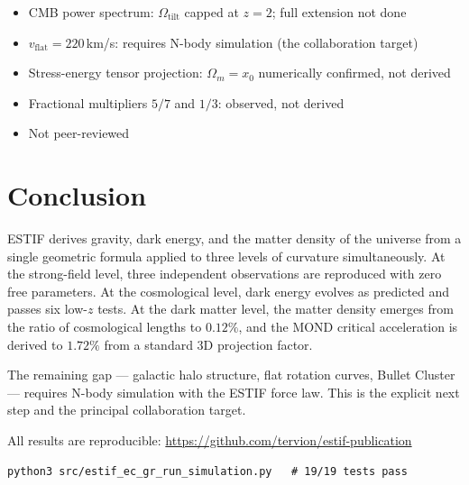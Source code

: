 \documentclass[12pt]{article}
\begin{document}
\begin{itemize}
\item CMB power spectrum: $\Omega_\text{tilt}$ capped at $z = 2$; full extension not done
\item $v_\text{flat} = 220$\,km/s: requires N-body simulation (the collaboration target)
\item Stress-energy tensor projection: $\Omega_m = x_0$ numerically confirmed, not derived
\item Fractional multipliers $5/7$ and $1/3$: observed, not derived
\item Not peer-reviewed
\end{itemize}

\section{Conclusion}

ESTIF derives gravity, dark energy, and the matter density of the universe from a
single geometric formula applied to three levels of curvature simultaneously.
At the strong-field level, three independent observations are reproduced with zero
free parameters. At the cosmological level, dark energy evolves as predicted and
passes six low-$z$ tests. At the dark matter level, the matter density emerges
from the ratio of cosmological lengths to $0.12\%$, and the MOND critical
acceleration is derived to $1.72\%$ from a standard 3D projection factor.

The remaining gap --- galactic halo structure, flat rotation curves, Bullet Cluster ---
requires N-body simulation with the ESTIF force law. This is the explicit next step
and the principal collaboration target.

All results are reproducible: \url{https://github.com/tervion/estif-publication}

\begin{verbatim}
python3 src/estif_ec_gr_run_simulation.py   # 19/19 tests pass
\end{verbatim}
\end{document}
